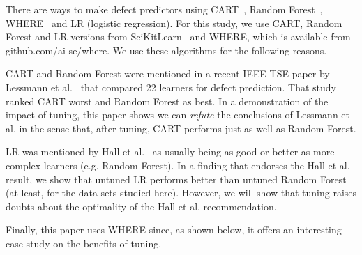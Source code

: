 \documentclass{sig-alternative}
\begin{document}
There  are ways to make defect predictors
using  CART~\cite{brieman00}, Random Forest~\cite{breiman84}, 
 WHERE~\cite{menzies2013local} and LR (logistic regression).
For this study, we use CART, Random Forest and LR versions  from 
SciKitLearn~\cite{scikit-learn} and
WHERE, which is available from
github.com/ai-se/where. 
 We use  these algorithms for the following reasons.
 
CART and Random Forest were mentioned in
a recent IEEE TSE paper by Lessmann et al.~\cite{lessmann2008benchmarking} that compared 22  
learners for  defect prediction.
That study ranked  CART  worst  and Random Forest as best.
In a demonstration of the impact of tuning,
this paper shows  we can {\em refute} the conclusions of  Lessmann et al.
in the sense that, after tuning,
CART
performs just as well as
 Random Forest.

LR was  mentioned by Hall et al.~\cite{hall11}
as usually being as good or better as more complex learners (e.g.
Random Forest). In a finding that endorses the Hall et al. result,
we show that untuned LR performs better than 
untuned Random Forest (at least, for the data sets studied here). However,
we will show that tuning raises doubts about the optimality of the
Hall et al. recommendation.

Finally,  this
 paper uses WHERE since, as shown below,
it offers an interesting case study on the benefits of tuning.

  
\end{document}

